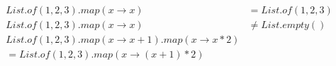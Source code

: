 \begin{align*}
  List.of(1,2,3).map(x \to x) & = List.of(1,2,3) \\
  List.of(1,2,3).map(x \to x) & \neq List.empty() \\
  List.of(1,2,3).map(x \to x + 1).map(x \to x * 2) \\
  = List.of(1,2,3).map(x \to (x + 1) * 2) \\
\end{align*}

